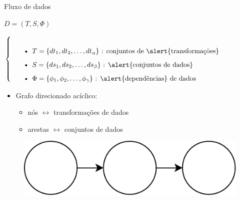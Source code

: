 \documentclass[12pt,compress,final]{beamer}
\begin{document}
\begin{frame}[t]{Fluxo de dados}

\centerline{$D = (T, S, \Phi)$}

$\left\{
\begin{tabular}{p{\textwidth}}
\begin{itemize}
    \item \( T = \{dt_1, dt_2, \ldots, dt_{\alpha}\} \) : conjuntos de \alert{transformações}
    \item \( S = \{ds_1, ds_2, \ldots, ds_{\beta}\} \) : \alert{conjuntos de dados}
    \item \( \Phi = \{\phi_1, \phi_2, \ldots, \phi_{\gamma}\} \) : \alert{dependências} de dados
\end{itemize}
\end{tabular}
\right.$

\vfill

\begin{itemize}
\item \alert{Grafo} direcionado acíclico:
\begin{itemize}
\item nós $\leftrightarrow$ transformações de dados
\item arestas $\leftrightarrow$ conjuntos de dados
\end{itemize}
\end{itemize}

\begin{figure}
\includegraphics[width=.35\textwidth]{img/graph.pdf}
\end{figure}
\end{frame}


% 
% 
% 
% 
\end{document}
